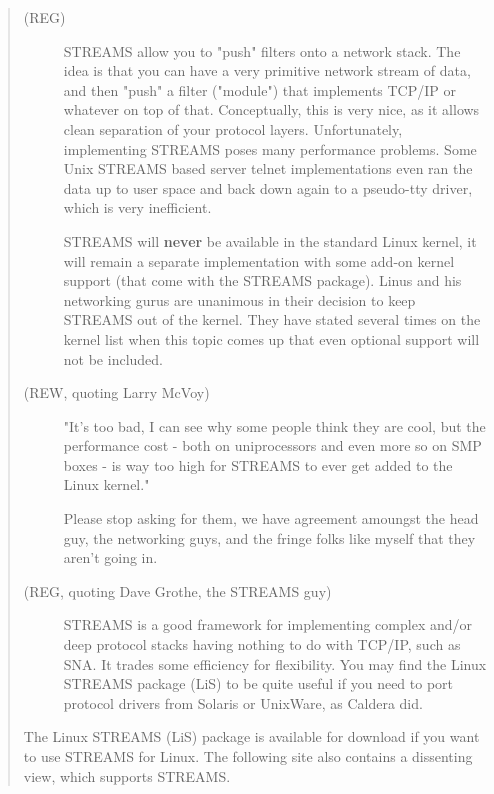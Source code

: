 \documentclass[letterpaper,final,notitlepage,twocolumn,10pt,twoside]{article}
\let\normalsize = \small
\let\small = \footnotesize
\let\footnotesize = \scriptsize
\let\scriptsize = \tiny
\begin{document}
\footnotesize
\begin{quote}

\begin{description}

\item[(REG)] STREAMS allow you to "push" filters onto a network stack.  The idea is that you can
have a very primitive network stream of data, and then "push" a filter ("module") that implements
TCP/IP or whatever on top of that.  Conceptually, this is very nice, as it allows clean separation
of your protocol layers.  Unfortunately, implementing STREAMS poses many performance problems.  Some
Unix STREAMS based server telnet implementations even ran the data up to user space and back down
again to a pseudo-tty driver, which is very inefficient.

STREAMS will \textbf{never} be available in the standard Linux kernel, it will remain a separate
implementation with some add-on kernel support (that come with the STREAMS package).  Linus and his
networking gurus are unanimous in their decision to keep STREAMS out of the kernel.  They have
stated several times on the kernel list when this topic comes up that even optional support will not
be included.

\item[(REW, quoting Larry McVoy)] "It's too bad, I can see why some people think they are cool, but
the performance cost - both on uniprocessors and even more so on SMP boxes - is way too high for
STREAMS to ever get added to the Linux kernel."

Please stop asking for them, we have agreement amoungst the head guy, the networking guys, and the
fringe folks like myself that they aren't going in.

\item[(REG, quoting Dave Grothe, the STREAMS guy)] STREAMS is a good framework for implementing
complex and/or deep protocol stacks having nothing to do with TCP/IP, such as SNA.  It trades some
efficiency for flexibility.  You may find the Linux STREAMS package (LiS) to be quite useful if you
need to port protocol drivers from Solaris or UnixWare, as Caldera did.

\end{description}

The Linux STREAMS (LiS) package is available for download if you want to use STREAMS for Linux.  The
following site also contains a dissenting view, which supports STREAMS.

\end{quote}
\normalsize
\end{document}
